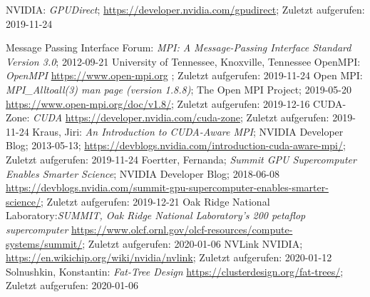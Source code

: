 		NVIDIA: {\sl GPUDirect};
		\url{https://developer.nvidia.com/gpudirect}; Zuletzt aufgerufen: 2019-11-24

		Message Passing Interface Forum: {\sl MPI: A Message-Passing Interface Standard Version 3.0}; 2012-09-21
		University of Tennessee, Knoxville, Tennessee
		OpenMPI: {\sl OpenMPI}
		\url{https://www.open-mpi.org} ; Zuletzt aufgerufen: 2019-11-24
		Open MPI: {\sl MPI\_Alltoall(3) man page (version 1.8.8)};
		The Open MPI Project; 2019-05-20
		\url {https://www.open-mpi.org/doc/v1.8/}; Zuletzt aufgerufen: 2019-12-16
		CUDA-Zone: {\sl CUDA}
		\url{https://developer.nvidia.com/cuda-zone}; Zuletzt aufgerufen: 2019-11-24
		Kraus, Jiri: {\sl An Introduction to CUDA-Aware MPI};
		NVIDIA Developer Blog; 2013-05-13;	
		\url{https://devblogs.nvidia.com/introduction-cuda-aware-mpi/}; Zuletzt aufgerufen: 2019-11-24
		Foertter, Fernanda; {\sl Summit GPU Supercomputer Enables Smarter Science}; NVIDIA Developer Blog; 2018-06-08
		\url{https://devblogs.nvidia.com/summit-gpu-supercomputer-enables-smarter-science/}; Zuletzt aufgerufen: 2019-12-21
		Oak Ridge National Laboratory:{\sl SUMMIT, Oak Ridge National Laboratory's 200 petaflop supercomputer}
		\url{https://www.olcf.ornl.gov/olcf-resources/compute-systems/summit/}; Zuletzt aufgerufen: 2020-01-06
	NVLink NVIDIA;
	\url{https://en.wikichip.org/wiki/nvidia/nvlink}; Zuletzt aufgerufen: 2020-01-12
		Solnushkin, Konstantin: {\sl Fat-Tree Design}
		\url{https://clusterdesign.org/fat-trees/}; Zuletzt aufgerufen: 2020-01-06
